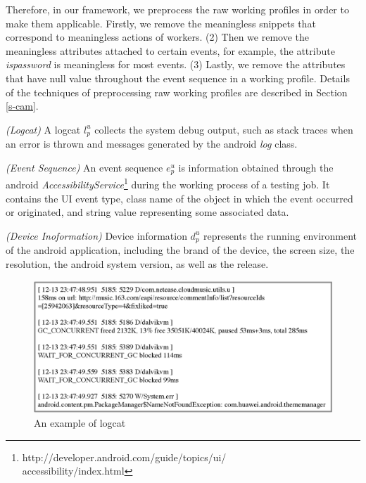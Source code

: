 \documentclass[10pt,conference]{IEEEtran}
\begin{document}
Therefore, in our framework, we preprocess the raw working profiles in order to make them applicable.
Firstly, we remove the meaningless snippets that correspond to meaningless actions
of workers. (2) Then we remove the meaningless attributes attached to certain events, for example, the attribute
\emph{ispassword} is meaningless for most events. (3) Lastly, we remove the attributes that have null value throughout
the event sequence in a working profile. Details of the techniques of preprocessing raw working profiles are
described in Section \ref{s-cam}.


\begin{definition}\label{def:logcat}
 \emph{(Logcat)}
A logcat $l^{u}_p$ collects the system debug output, such as stack traces when an error is thrown and
messages generated by the android \emph{log} class.
\end{definition}

\begin{definition}
 \emph{(Event Sequence)}
An event sequence $e^{u}_p$ is information obtained through the android \emph{AccessibilityService}\footnote{http://developer.android.com/guide/topics/ui/\\accessibility/index.html}
during the working process of a testing job. It contains the UI event type, class name of the object in which the event occurred or originated, and string
value representing some associated data.
\end{definition}

\begin{definition}
 \emph{(Device Inoformation)}
Device information $d^{u}_p$ represents the running environment of the android application, including the brand of the device, the screen size, the
resolution, the android system version, as well as the release.
\end{definition}

\begin{figure}[!htbp]
\centering
\includegraphics[width=0.85\columnwidth]{Figure/logcat}
\caption{An example of logcat}
\label{fig:logcat}
\end{figure}
\end{document}
